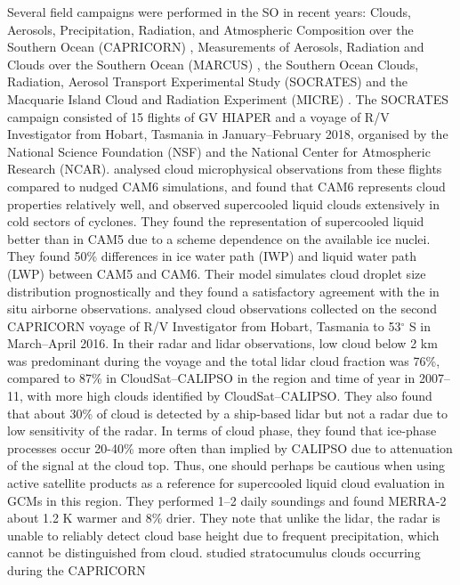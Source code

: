 Several field campaigns were performed in the SO in recent years:
Clouds, Aerosols, Precipitation, Radiation, and Atmospheric Composition over the Southern Ocean (CAPRICORN) \citep{mace2018a,mace2018b}, Measurements of Aerosols, Radiation and Clouds over the Southern Ocean (MARCUS) \citep{mcfarquhar2016},
the Southern Ocean Clouds, Radiation, Aerosol Transport Experimental Study (SOCRATES) \citep{mcfarquhar2014} and the Macquarie Island Cloud and Radiation Experiment (MICRE) \citep{demott2018}.
The SOCRATES campaign consisted of 15 flights of GV HIAPER and a voyage
of R/V Investigator from Hobart, Tasmania in January--February 2018,
organised by the National Science Foundation (NSF) and the
National Center for Atmospheric Research (NCAR). \cite{gettelman2020}
analysed cloud microphysical observations from these flights compared
to nudged CAM6 simulations, and found that CAM6 represents cloud properties
relatively well, and observed supercooled liquid clouds extensively in cold
sectors of cyclones. They found the representation of supercooled liquid
better than in CAM5 due to a scheme dependence on the available ice nuclei.
They found 50\% differences in ice water path (IWP) and liquid water path (LWP)
between CAM5 and CAM6. Their model simulates cloud droplet size distribution
prognostically and they found a satisfactory agreement with the in situ
airborne observations.
\cite{mace2018a} analysed cloud observations collected on the second CAPRICORN
voyage of R/V Investigator from Hobart, Tasmania to 53$^\circ$ S in March--April 2016.
In their radar and lidar observations, low cloud below 2 km was predominant
during the voyage and the total lidar cloud fraction was 76\%, compared to 87\%
in CloudSat--CALIPSO in the region and time of year in 2007--11, with
more high clouds identified by CloudSat--CALIPSO.
They also found that about 30\% of cloud is detected by a ship-based lidar but not
a radar due to low sensitivity of the radar. In terms of cloud phase,
they found that ice-phase processes occur 20-40\% more often than implied
by CALIPSO due to attenuation of the signal at the cloud top. Thus, one should
perhaps be cautious when using active satellite
products as a reference for supercooled liquid cloud evaluation in GCMs
in this region. They performed 1--2 daily soundings and found MERRA-2 about
1.2 K warmer and 8\% drier. They note that unlike the lidar, the radar is unable
to reliably detect cloud base height due to frequent precipitation, which
cannot be distinguished from cloud.
\cite{mace2018b} studied stratocumulus clouds occurring during the CAPRICORN
